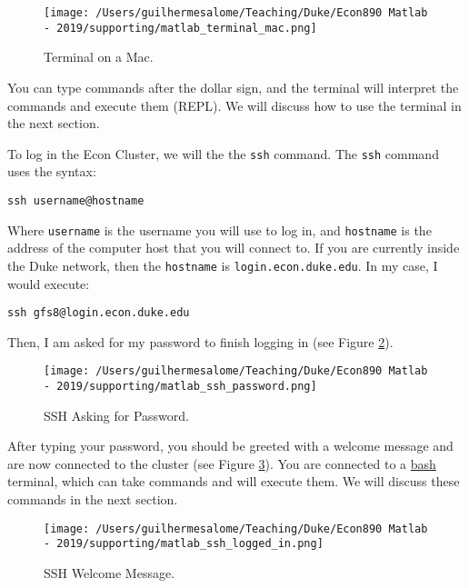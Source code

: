 \documentclass[12pt, a4paper]{article}
\begin{document}
\begin{figure}[H]
\centering
\texttt{[image: /Users/guilhermesalome/Teaching/Duke/Econ890 Matlab - 2019/supporting/matlab\_terminal\_mac.png]}
\caption{\label{fig:org50e0690}
Terminal on a Mac.}
\end{figure}

You can type commands after the dollar sign, and the terminal will interpret the commands and execute them (REPL).
We will discuss how to use the terminal in the next section.

To log in the Econ Cluster, we will the the \texttt{ssh} command.
The \texttt{ssh} command uses the syntax:
\lstset{language=bash,label= ,caption= ,captionpos=b,firstnumber=1,numbers=left,style=bash}
\begin{lstlisting}
ssh username@hostname
\end{lstlisting}
Where \texttt{username} is the username you will use to log in, and \texttt{hostname} is the address of the computer host that you will connect to.
If you are currently inside the Duke network, then the \texttt{hostname} is \texttt{login.econ.duke.edu}.
In my case, I would execute:
\lstset{language=bash,label= ,caption= ,captionpos=b,firstnumber=1,numbers=left,style=bash}
\begin{lstlisting}
ssh gfs8@login.econ.duke.edu
\end{lstlisting}
Then, I am asked for my password to finish logging in (see Figure \ref{fig:orgf273554}).

\begin{figure}[H]
\centering
\texttt{[image: /Users/guilhermesalome/Teaching/Duke/Econ890 Matlab - 2019/supporting/matlab\_ssh\_password.png]}
\caption{\label{fig:orgf273554}
SSH Asking for Password.}
\end{figure}

After typing your password, you should be greeted with a welcome message and are now connected to the cluster (see Figure \ref{fig:orgee83f1f}).
You are connected to a \href{https://en.wikipedia.org/wiki/Bash\_(Unix\_shell)}{bash} terminal, which can take commands and will execute them.
We will discuss these commands in the next section.

\begin{figure}[H]
\centering
\texttt{[image: /Users/guilhermesalome/Teaching/Duke/Econ890 Matlab - 2019/supporting/matlab\_ssh\_logged\_in.png]}
\caption{\label{fig:orgee83f1f}
SSH Welcome Message.}
\end{figure}
\end{document}

